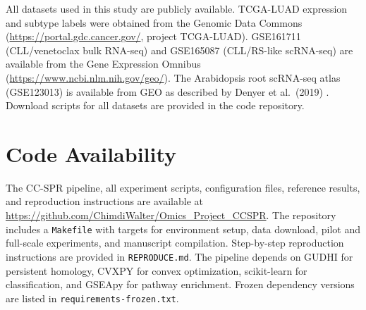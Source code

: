 \documentclass[11pt]{article}
\begin{document}
All datasets used in this study are publicly available.
TCGA-LUAD expression and subtype labels were obtained from the Genomic Data Commons (\url{https://portal.gdc.cancer.gov/}, project TCGA-LUAD).
GSE161711 (CLL/venetoclax bulk RNA-seq) and GSE165087 (CLL/RS-like scRNA-seq) are available from the Gene Expression Omnibus (\url{https://www.ncbi.nlm.nih.gov/geo/}).
The Arabidopsis root scRNA-seq atlas (GSE123013) is available from GEO as described by Denyer et al.\ (2019) \cite{denyer2019}.
Download scripts for all datasets are provided in the code repository.

\section*{Code Availability}

The CC-SPR pipeline, all experiment scripts, configuration files, reference results, and reproduction instructions are available at \url{https://github.com/ChimdiWalter/Omics_Project_CCSPR}.
The repository includes a \texttt{Makefile} with targets for environment setup, data download, pilot and full-scale experiments, and manuscript compilation.
Step-by-step reproduction instructions are provided in \texttt{REPRODUCE.md}.
The pipeline depends on GUDHI \cite{gudhi2014} for persistent homology, CVXPY for convex optimization, scikit-learn for classification, and GSEApy \cite{gseapy} for pathway enrichment.
Frozen dependency versions are listed in \texttt{requirements-frozen.txt}.
\end{document}

